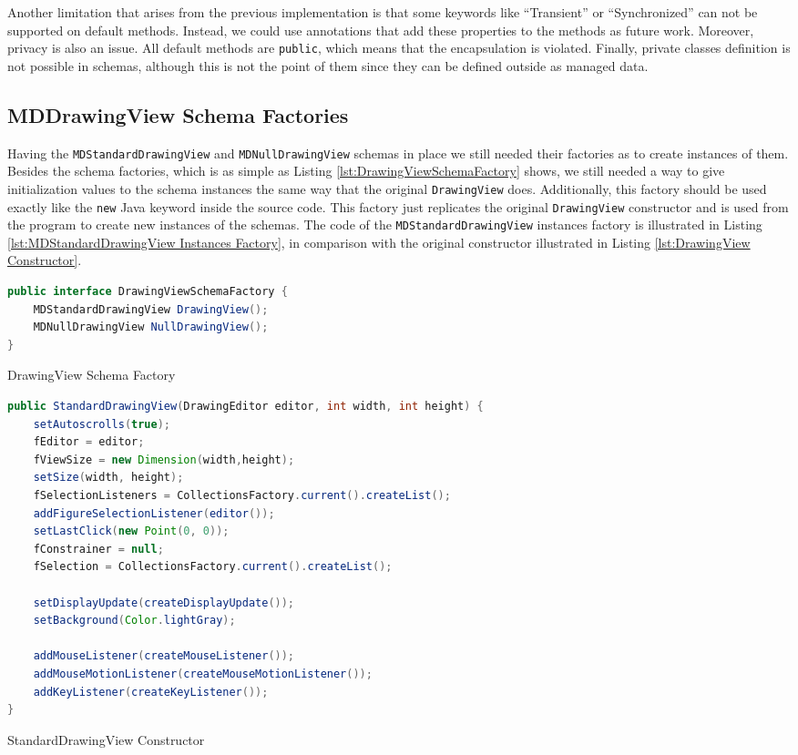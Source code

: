 Another limitation that arises from the previous implementation is that some keywords like ``Transient'' or ``Synchronized'' can not be supported on default methods.
Instead, we could use annotations that add these properties to the methods as future work.
Moreover, privacy is also an issue.
All default methods are \texttt{public}, which means that the encapsulation is violated.
Finally, private classes definition is not possible in schemas, although this is not the point of them since they can be defined outside as managed data.

\subsection{MDDrawingView Schema Factories}
Having the \texttt{MDStandardDrawingView} and \texttt{MDNullDrawingView} schemas in place we still needed their factories as to create instances of them.
Besides the schema factories, which is as simple as Listing \ref{lst:DrawingViewSchemaFactory} shows, we still needed a way to give initialization values to the schema instances the same way that the original \texttt{DrawingView} does.
Additionally, this factory should be used exactly like the \texttt{new} Java keyword inside the source code.
This factory just replicates the original \texttt{DrawingView} constructor and is used from the program to create new instances of the schemas.
The code of the \texttt{MDStandardDrawingView} instances factory is illustrated in Listing \ref{lst:MDStandardDrawingView Instances Factory}, in comparison with the original constructor illustrated in Listing \ref{lst:DrawingView Constructor}.

\begin{sourcecode}[H]
	\begin{lstlisting}[language=Java, escapechar=|]
public interface DrawingViewSchemaFactory {
	MDStandardDrawingView DrawingView();
	MDNullDrawingView NullDrawingView();
}
	\end{lstlisting}
	\caption{DrawingView Schema Factory}
	\label{lst:DrawingViewSchemaFactory}
\end{sourcecode}

\begin{sourcecode}[H]
	\begin{lstlisting}[language=Java, escapechar=|]
public StandardDrawingView(DrawingEditor editor, int width, int height) {
	setAutoscrolls(true);
	fEditor = editor;
	fViewSize = new Dimension(width,height);
	setSize(width, height);
	fSelectionListeners = CollectionsFactory.current().createList();
	addFigureSelectionListener(editor());
	setLastClick(new Point(0, 0));
	fConstrainer = null;
	fSelection = CollectionsFactory.current().createList();

	setDisplayUpdate(createDisplayUpdate());
	setBackground(Color.lightGray);

	addMouseListener(createMouseListener());
	addMouseMotionListener(createMouseMotionListener());
	addKeyListener(createKeyListener());
}
	\end{lstlisting}
	\label{lst:DrawingView Constructor}
	\caption{StandardDrawingView Constructor}
\end{sourcecode}


